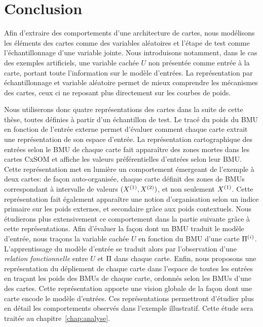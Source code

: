\documentclass[../main]{subfiles}
\begin{document}



\section{Conclusion}

Afin d'extraire des comportements d'une architecture de cartes, nous modélisons les éléments des cartes comme des variables aléatoires et l'étape de test comme l'échantillonnage d'une variable jointe. Nous introduisons notamment, dans le cas des exemples artificiels, une variable cachée $U$ non présentée comme entrée à la carte, portant toute l'information sur le modèle d'entrées.
La représentation par échantillonnage et variable aléatoire permet de mieux comprendre les mécanismes des cartes, ceux ci ne reposant plus directement sur les courbes de poids.

Nous utiliserons donc quatre représentations des cartes dans la suite de cette thèse, toutes définies à partir d'un échantillon de test.
Le tracé du poids du BMU en fonction de l'entrée externe permet d'évaluer comment chaque carte extrait une représentation de son espace d'entrée.
La représentation cartographique des entrées selon le BMU de chaque carte fait apparaître des zones mortes dans les cartes CxSOM et affiche les valeurs préférentielles d'entrées selon leur BMU. Cette représentation met en lumière un comportement émergeant de l'exemple à deux cartes: de façon auto-organisée, chaque carte définit des zones de BMUs correspondant à intervalle de valeurs $(X^{({1})},X^{({2})})$, et non seulement $X^{({1})}$. Cette représentation fait également apparaître une notion d'organisation selon un indice primaire sur les poids externes, et secondaire grâce aux poids contextuels. Nous étudierons plus extensivement ce comportement dans la partie suivante grâce à cette représentations.
Afin d'évaluer la façon dont un BMU traduit le modèle d'entrée, nous traçons la variable cachée $U$ en fonction du BMU d'une carte $\Pi^{({i})}$.
L'apprentissage du modèle d'entrée se traduit alors par l'observation d'une \emph{relation fonctionnelle} entre $U$ et $\Pi$ dans chaque carte.
Enfin, nous proposons une représentation du dépliement de chaque carte dans l'espace de toutes les entrées en traçant les poids des BMUs de chaque carte, ordonnés selon les BMUs d'une des cartes. Cette représentation apporte une vision globale de la façon dont une carte encode le modèle d'entrées.
Ces représentations permettront d'étudier plus en détail les comportements observés dans l'exemple illustratif. Cette étude sera traitée au chapitre~\ref{chap:analyse}.
\end{document}
